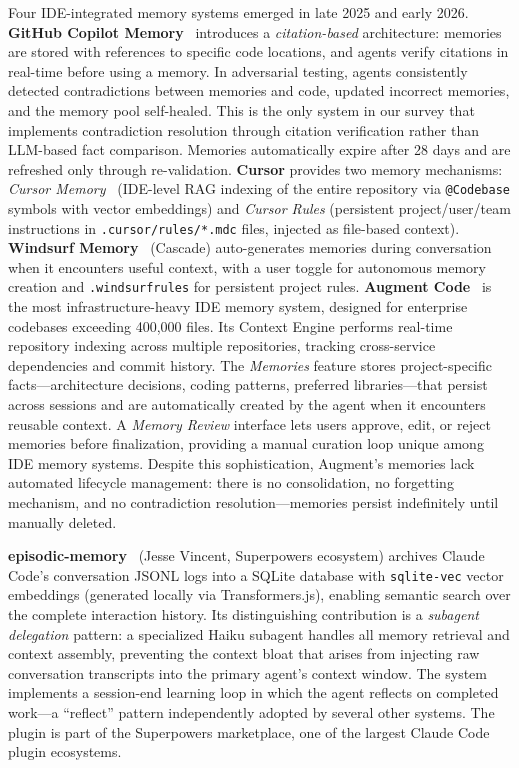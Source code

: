 Four IDE-integrated memory systems emerged in late 2025 and early 2026.
\textbf{GitHub Copilot Memory}~\cite{copilot2026} introduces a
\emph{citation-based} architecture: memories are stored with references
to specific code locations, and agents verify citations in real-time
before using a memory.  In adversarial testing, agents consistently
detected contradictions between memories and code, updated incorrect
memories, and the memory pool self-healed.  This is the only system in
our survey that implements contradiction resolution through citation
verification rather than LLM-based fact comparison.  Memories
automatically expire after 28 days and are refreshed only through
re-validation.
\textbf{Cursor} provides two memory mechanisms:
\emph{Cursor Memory}~\cite{cursor2026} (IDE-level RAG indexing of the
entire repository via \texttt{@Codebase} symbols with vector embeddings)
and \emph{Cursor Rules} (persistent project/user/team instructions in
\texttt{.cursor/rules/*.mdc} files, injected as file-based context).
\textbf{Windsurf Memory}~\cite{windsurf2026} (Cascade) auto-generates
memories during conversation when it encounters useful context, with
a user toggle for autonomous memory creation and
\texttt{.windsurfrules} for persistent project rules.
\textbf{Augment Code}~\cite{augment2026} is the most
infrastructure-heavy IDE memory system, designed for enterprise
codebases exceeding 400{,}000 files.  Its Context Engine performs
real-time repository indexing across multiple repositories, tracking
cross-service dependencies and commit history.  The \emph{Memories}
feature stores project-specific facts---architecture decisions, coding
patterns, preferred libraries---that persist across sessions and are
automatically created by the agent when it encounters reusable context.
A \emph{Memory Review} interface lets users approve, edit, or reject
memories before finalization, providing a manual curation loop unique
among IDE memory systems.  Despite this sophistication, Augment's
memories lack automated lifecycle management: there is no consolidation,
no forgetting mechanism, and no contradiction resolution---memories
persist indefinitely until manually deleted.

\textbf{episodic-memory}~\cite{vincent2025episodic} (Jesse Vincent,
Superpowers ecosystem) archives Claude Code's conversation JSONL logs
into a SQLite database with \texttt{sqlite-vec} vector embeddings
(generated locally via Transformers.js), enabling semantic search over
the complete interaction history.  Its distinguishing contribution is a
\emph{subagent delegation} pattern: a specialized Haiku subagent handles
all memory retrieval and context assembly, preventing the context bloat
that arises from injecting raw conversation transcripts into the primary
agent's context window.  The system implements a session-end learning
loop in which the agent reflects on completed work---a ``reflect''
pattern independently adopted by several other systems.  The plugin is
part of the Superpowers marketplace, one of the largest Claude Code
plugin ecosystems.

